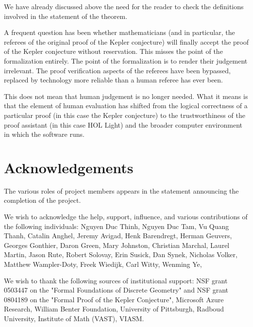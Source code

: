 We have already discussed above the need for the reader to check the definitions involved in the statement of the theorem.

A frequent question has been whether mathematicians (and in particular, the referees of the original proof of the Kepler conjecture)
will finally accept the proof of the Kepler conjecture without reservation.  This misses the point of the formalization entirely.
The point of the formalization is to render their judgement irrelevant.  The proof verification aspects of the referees 
have been bypassed, replaced by technology
more reliable than a human referee has ever been.

This does not mean that human judgement is no longer needed.  What it means is that the element of human evaluation has shifted from
the logical correctness of a particular proof (in this case the Kepler conjecture) to the trustworthiness of the proof assistant
(in this case HOL Light) and the broader computer environment in which the software runs.


\section{Acknowledgements}

The various roles of project members appears in the statement announcing the completion of the project.

We wish to acknowledge the help, support, influence, and various contributions of the following individuals:
Nguyen Duc Thinh,  
Nguyen Duc Tam, 
Vu Quang Thanh,
% 
Catalin Anghel, 
Jeremy Avigad, 
Henk Barendregt,
%
Herman Geuvers,
Georges Gonthier,
Daron Green,
Mary Johnston,
Christian Marchal,
Laurel %
Martin, 
%
Jason Rute,
Robert Solovay,
Erin Susick,
Dan Synek,
Nicholas Volker, 
Matthew Wampler-Doty, 
Freek Wiedijk, 
Carl Witty,
Wenming Ye,

We wish to thank the following sources of institutional support:
NSF grant 0503447 on the "Formal Foundations of Discrete Geometry" and NSF grant 0804189 on the "Formal Proof of the Kepler Conjecture", 
Microsoft Azure Research, William Benter Foundation, University of Pittsburgh, Radboud University, Institute of Math (VAST), VIASM.


